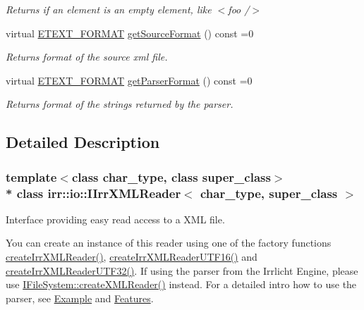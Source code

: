 \begin{DoxyCompactItemize}
\begin{DoxyCompactList}\small\item\em Returns if an element is an empty element, like $<$foo /$>$ \end{DoxyCompactList}\item 
virtual \hyperlink{namespaceirr_1_1io_ac7e51e5a6bd00451dec248f497b16a9d}{E\+T\+E\+X\+T\+\_\+\+F\+O\+R\+M\+AT} \hyperlink{classirr_1_1io_1_1IIrrXMLReader_ae43dfce5f583202501bb1fc9eeb42df7}{get\+Source\+Format} () const  =0
\begin{DoxyCompactList}\small\item\em Returns format of the source xml file. \end{DoxyCompactList}\item 
virtual \hyperlink{namespaceirr_1_1io_ac7e51e5a6bd00451dec248f497b16a9d}{E\+T\+E\+X\+T\+\_\+\+F\+O\+R\+M\+AT} \hyperlink{classirr_1_1io_1_1IIrrXMLReader_ac124d1c4fa2909d5328de5a616b4af44}{get\+Parser\+Format} () const  =0
\begin{DoxyCompactList}\small\item\em Returns format of the strings returned by the parser. \end{DoxyCompactList}\end{DoxyCompactItemize}


\subsection{Detailed Description}
\subsubsection*{template$<$class char\+\_\+type, class super\+\_\+class$>$\\*
class irr\+::io\+::\+I\+Irr\+X\+M\+L\+Reader$<$ char\+\_\+type, super\+\_\+class $>$}

Interface providing easy read access to a X\+ML file. 

You can create an instance of this reader using one of the factory functions \hyperlink{namespaceirr_1_1io_a581f4d4648398759c61266d63d7106b1}{create\+Irr\+X\+M\+L\+Reader()}, \hyperlink{namespaceirr_1_1io_a86473ef152c15b685af181a4c5461a5d}{create\+Irr\+X\+M\+L\+Reader\+U\+T\+F16()} and \hyperlink{namespaceirr_1_1io_ae05bf7ee342431ea8c98fb98e75b974a}{create\+Irr\+X\+M\+L\+Reader\+U\+T\+F32()}. If using the parser from the Irrlicht Engine, please use \hyperlink{classirr_1_1io_1_1IFileSystem_a167c9fa159d16ee5c56c074636b0865e}{I\+File\+System\+::create\+X\+M\+L\+Reader()} instead. For a detailed intro how to use the parser, see \hyperlink{index_irrxmlexample}{Example} and \hyperlink{index_features}{Features}.

